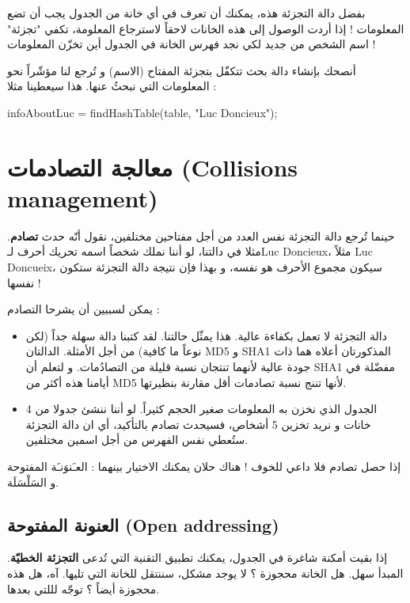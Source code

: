 بفضل دالة التجزئة هذه، يمكنك أن تعرف في أي خانة من الجدول يجب أن تضع المعلومات ! إذا أردت الوصول إلى هذه الخانات لاحقاً لاسترجاع المعلومة، تكفي "تجزئة" اسم الشخص من جديد لكي نجد فهرس الخانة في الجدول أين تخزّن المعلومات !

أنصحك بإنشاء دالة بحث تتكفّل بتجزئة المفتاح (الاسم) و تُرجع لنا مؤشّراً نحو المعلومات التي نبحثُ عنها. هذا سيعطينا مثلا :

\begin{Csource}
infoAboutLuc = findHashTable(table, "Luc Doncieux");
\end{Csource}

\section{معالجة التصادمات (\textenglish{Collisions management})}

حينما تُرجع دالة التجزئة نفس العدد من أجل مفتاحين مختلفين، نقول أنّه حدث 
\textbf{تصادم}.
مثلا في دالتنا، لو أننا نملك شخصاً اسمه تحريك أحرف لـ\textenglish{Luc Doncieux}،
مثلاً
\textenglish{Luc Doncueix}،
سيكون مجموع الأحرف هو نفسه، و بهذا فإن نتيجة دالة التجزئة ستكون نفسها !

يمكن لسببين أن يشرحا التصادم :

\begin{itemize}
	\item دالة التجزئة لا تعمل بكفاءة عالية. هذا يمثّل حالتنا. لقد كتبنا دالة سهلة جداً (لكن نوعاً ما كافية) من أجل الأمثلة. الدالتان 
	\textenglish{MD5}
	و
	\textenglish{SHA1}
	المذكورتان أعلاه هما ذات جودة عالية لأنهما تنتجان نسبة قليلة من التصادُمات. و لتعلم أن 
	\textenglish{SHA1}
	مفضّلة في أيامنا هذه أكثر من
	\textenglish{MD5}
	لأنها تننج نسبة تصادمات أقل مقارنة بنظيرتها.
	
	\item الجدول الذي نخزن به المعلومات صغير الحجم كثيراً. لو أننا ننشئ جدولا من 4 خانات و نريد تخزين 5 أشخاص، فسيحدث تصادم بالتأكيد، أي ان دالة التجزئة ستُعطي نفس الفهرس من أجل اسمين مختلفين.
\end{itemize}

إذا حصل تصادم فلا داعي للخوف ! هناك حلان يمكنك الاختيار بينهما : العـَنوَنـَة المفتوحة و السَلْسَلَة.


\subsection{العنونة المفتوحة (\textenglish{Open addressing})}
إذا بقيت أمكنة شاغرة في الجدول، يمكنك تطبيق التقنية التي تُدعى 
\textbf{التجزئة الخطيّة}.
المبدأ سهل. هل الخانة محجوزة ؟ لا يوجد مشكل، سننتقل للخانة التي تليها. آه، هل هذه محجوزة أيضاً ؟ توجّه لللتي بعدها.

